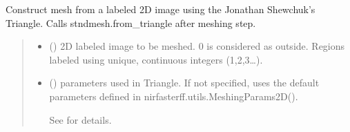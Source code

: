 \documentclass[letterpaper,10pt,english]{sphinxmanual}
\begin{document}
\begin{fulllineitems}
\begin{fulllineitems}
\label{\detokenize{_autosummary/nirfasterff.base.stnd_mesh.stndmesh:nirfasterff.base.stnd_mesh.stndmesh.from_image}}
\pysigstartsignatures
\pysiglinewithargsret
{}
{\sphinxparamcomma {}\sphinxparamcomma {}\sphinxparamcomma {}\sphinxparamcomma {}\sphinxparamcomma {}}
{}
\pysigstopsignatures
\sphinxAtStartPar
Construct mesh from a labeled 2D image using the Jonathan Shewchuk’s Triangle. Calls stndmesh.from\_triangle after meshing step.
\begin{quote}\begin{description}
\begin{itemize}
\item {} 
\sphinxAtStartPar
{} (\sphinxstyleliteralemphasis{\sphinxupquote{ (}}\sphinxstyleliteralemphasis{\sphinxupquote{) }}) \textendash{} 2D labeled image to be meshed. 0 is considered as outside. Regions labeled using unique, continuous integers (1,2,3…).

\item {} 
\sphinxAtStartPar
{} ({\hyperref[\detokenize{_autosummary/nirfasterff.utils.MeshingParams2D:nirfasterff.utils.MeshingParams2D}]{}}\sphinxstyleliteralemphasis{\sphinxupquote{, }}) \textendash{} 
\sphinxAtStartPar
parameters used in Triangle. If not specified, uses the default parameters defined in nirfasterff.utils.MeshingParams2D().

\sphinxAtStartPar
See {\hyperref[\detokenize{_autosummary/nirfasterff.utils.MeshingParams2D:nirfasterff.utils.MeshingParams2D}]{}} for details.



\end{itemize}
\end{description}
\end{quote}
\end{fulllineitems}
\end{fulllineitems}
\end{document}

